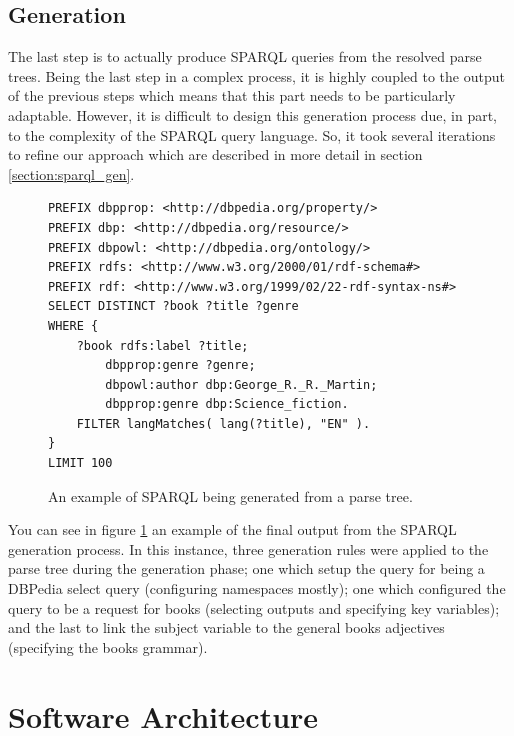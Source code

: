 \documentclass[11pt]{article}
\begin{document}
\subsection{Generation}
\label{gen}
The last step is to actually produce SPARQL queries from the resolved parse trees.
Being the last step in a complex process, it is highly coupled to the output of the
previous steps which means that this part needs to be particularly adaptable.
However, it is difficult to design this generation process due, in part, 
to the complexity of the SPARQL query language. 
So, it took several iterations to refine our approach which are described
in more detail in section \ref{section:sparql_gen}.


\begin{figure}[h!]
\begin{verbatim}
PREFIX dbpprop: <http://dbpedia.org/property/>
PREFIX dbp: <http://dbpedia.org/resource/>
PREFIX dbpowl: <http://dbpedia.org/ontology/>
PREFIX rdfs: <http://www.w3.org/2000/01/rdf-schema#>
PREFIX rdf: <http://www.w3.org/1999/02/22-rdf-syntax-ns#>
SELECT DISTINCT ?book ?title ?genre
WHERE {
    ?book rdfs:label ?title;
        dbpprop:genre ?genre;
        dbpowl:author dbp:George_R._R._Martin;
        dbpprop:genre dbp:Science_fiction.
    FILTER langMatches( lang(?title), "EN" ).
}
LIMIT 100
\end{verbatim}
\caption{An example of SPARQL being generated from a parse tree.}
\label{fig:gen_example}
\end{figure}

You can see in figure \ref{fig:gen_example} an example of the final output from the
SPARQL generation process. In this instance, three generation rules were applied to
the parse tree during the generation phase; one which setup the query for being
a DBPedia select query (configuring namespaces mostly); one which configured
the query to be a request for books (selecting outputs and specifying key variables);
and the last to link the subject variable to the general books adjectives (specifying
the books grammar). 

\clearpage

\section{Software Architecture}
\end{document}
